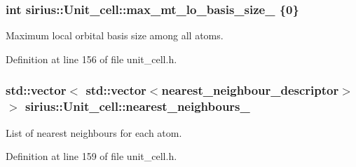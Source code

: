 \hypertarget{classsirius_1_1_unit__cell_af2da7ed61a428e6d5fdd239103ce9dc1}{}
\subsubsection[{max\+\_\+mt\+\_\+lo\+\_\+basis\+\_\+size\+\_\+}]{\setlength{\rightskip}{0pt plus 5cm}int sirius\+::\+Unit\+\_\+cell\+::max\+\_\+mt\+\_\+lo\+\_\+basis\+\_\+size\+\_\+ \{0\}\hspace{0.3cm}{\ttfamily [private]}}\label{classsirius_1_1_unit__cell_af2da7ed61a428e6d5fdd239103ce9dc1}


Maximum local orbital basis size among all atoms. 



Definition at line 156 of file unit\+\_\+cell.\+h.

\hypertarget{classsirius_1_1_unit__cell_a1d4fd34e939aac3561937c6307361ca3}{}
\subsubsection[{nearest\+\_\+neighbours\+\_\+}]{\setlength{\rightskip}{0pt plus 5cm}std\+::vector$<$ std\+::vector$<${\bf nearest\+\_\+neighbour\+\_\+descriptor}$>$ $>$ sirius\+::\+Unit\+\_\+cell\+::nearest\+\_\+neighbours\+\_\+\hspace{0.3cm}{\ttfamily [private]}}\label{classsirius_1_1_unit__cell_a1d4fd34e939aac3561937c6307361ca3}


List of nearest neighbours for each atom. 



Definition at line 159 of file unit\+\_\+cell.\+h.

\hypertarget{classsirius_1_1_unit__cell_a811f4365eb0377e75c2846c472e122df}{}
